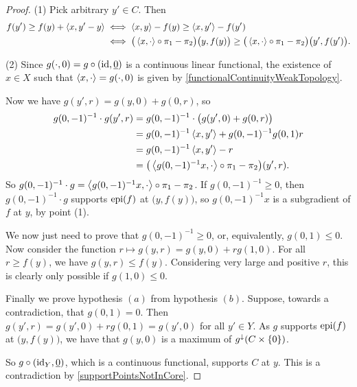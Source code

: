 \begin{proof}
(1) Pick arbitrary $y'\in C$. Then
\begin{align*}
f(y') \geq f(y) + \left\langle x, y'-y \right\rangle &\iff \left\langle x,y \right\rangle - f(y) \geq \left\langle x, y' \right\rangle - f(y') \\
&\iff \big(\left\langle x, \cdot \right\rangle\circ \pi_1 - \pi_2\big)\big(y, f(y)\big) \geq \big(\left\langle x, \cdot \right\rangle\circ \pi_1 - \pi_2\big)\big(y', f(y')\big).
\end{align*}

(2) Since $g(\cdot, 0) = g\circ(\operatorname{id}, \underline{0})$ is a continuous linear functional, the existence of $x\in X$ such that $\left\langle x,\cdot \right\rangle = g(\cdot, 0)$ is given by \ref{functionalContinuityWeakTopology}.

Now we have $g(y',r) = g(y,0) + g(0,r)$, so
\begin{align*}
g(0,-1)^{-1}\cdot g(y',r) &= g(0,-1)^{-1}\cdot \big(g(y',0) + g(0,r)\big) \\
&= g(0,-1)^{-1}\left\langle x, y' \right\rangle + g(0,-1)^{-1}g(0,1)r \\
&= g(0,-1)^{-1}\left\langle x, y' \right\rangle - r \\
&= \big(\left\langle g(0,-1)^{-1}x, \cdot \right\rangle\circ\pi_1 - \pi_2\big)(y',r).
\end{align*}
So $g(0,-1)^{-1}\cdot g = \left\langle g(0,-1)^{-1}x, \cdot \right\rangle\circ\pi_1 - \pi_2$. If $g(0,-1)^{-1} \geq 0$, then $g(0,-1)^{-1}\cdot g$ supports $\operatorname{epi}(f)$ at $\big(y, f(y)\big)$, so $g(0,-1)^{-1}x$ is a subgradient of $f$ at $y$, by point (1).

We now just need to prove that $g(0,-1)^{-1} \geq 0$, or, equivalently, $g(0,1) \leq 0$.
Now consider the function $r\mapsto g(y,r) = g(y,0)+rg(1,0)$. For all $r\geq f(y)$, we have $g(y,r) \leq f(y)$. Considering very large and positive $r$, this is clearly only possible if $g(1,0)\leq 0$.

Finally we prove hypothesis $(a)$ from hypothesis $(b)$. Suppose, towards a contradiction, that $g(0,1) = 0$. Then $g(y', r) = g(y',0)+ rg(0,1) = g(y',0)$ for all $y'\in Y$. As $g$ supports $\operatorname{epi}(f)$ at $\big(y, f(y)\big)$, we have that $g(y,0)$ is a maximum of $g^\downarrow(C\times\{0\})$.

So $g\circ (\operatorname{id}_Y,\underline{0})$, which is a continuous functional, supports $C$ at $y$. This is a contradiction by \ref{supportPointsNotInCore}.
\end{proof}

